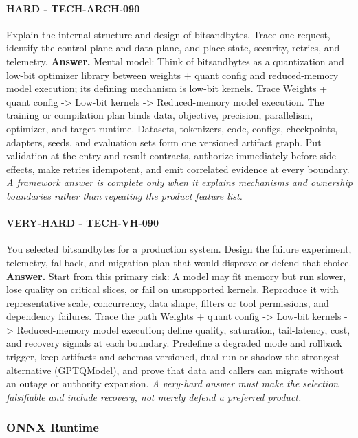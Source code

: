 \paragraph{HARD - TECH-ARCH-090} Explain the internal structure and design of bitsandbytes. Trace one request, identify the control plane and data plane, and place state, security, retries, and telemetry.
\textbf{Answer.} Mental model: Think of bitsandbytes as a quantization and low-bit optimizer library between weights + quant config and reduced-memory model execution; its defining mechanism is low-bit kernels. Trace Weights + quant config -> Low-bit kernels -> Reduced-memory model execution. The training or compilation plan binds data, objective, precision, parallelism, optimizer, and target runtime. Datasets, tokenizers, code, configs, checkpoints, adapters, seeds, and evaluation sets form one versioned artifact graph. Put validation at the entry and result contracts, authorize immediately before side effects, make retries idempotent, and emit correlated evidence at every boundary.
\textit{A framework answer is complete only when it explains mechanisms and ownership boundaries rather than repeating the product feature list.}
\paragraph{VERY-HARD - TECH-VH-090} You selected bitsandbytes for a production system. Design the failure experiment, telemetry, fallback, and migration plan that would disprove or defend that choice.
\textbf{Answer.} Start from this primary risk: A model may fit memory but run slower, lose quality on critical slices, or fail on unsupported kernels. Reproduce it with representative scale, concurrency, data shape, filters or tool permissions, and dependency failures. Trace the path Weights + quant config -> Low-bit kernels -> Reduced-memory model execution; define quality, saturation, tail-latency, cost, and recovery signals at each boundary. Predefine a degraded mode and rollback trigger, keep artifacts and schemas versioned, dual-run or shadow the strongest alternative (GPTQModel), and prove that data and callers can migrate without an outage or authority expansion.
\textit{A very-hard answer must make the selection falsifiable and include recovery, not merely defend a preferred product.}
\subsubsection*{ONNX Runtime}
